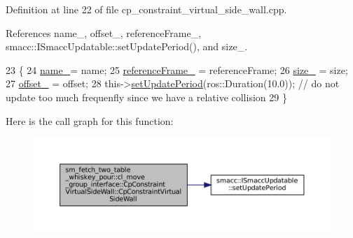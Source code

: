 Definition at line 22 of file cp\+\_\+constraint\+\_\+virtual\+\_\+side\+\_\+wall.\+cpp.



References name\+\_\+, offset\+\_\+, reference\+Frame\+\_\+, smacc\+::\+I\+Smacc\+Updatable\+::set\+Update\+Period(), and size\+\_\+.


\begin{DoxyCode}
23         \{
24             \hyperlink{classsm__fetch__two__table__whiskey__pour_1_1cl__move__group__interface_1_1CpConstraintVirtualSideWall_ae90ce7726ac0391281f3f256f855be68}{name\_}= name;
25             \hyperlink{classsm__fetch__two__table__whiskey__pour_1_1cl__move__group__interface_1_1CpConstraintVirtualSideWall_a6585ab4c5d9c3dd91be0d2d8b87804bb}{referenceFrame\_} = referenceFrame;
26             \hyperlink{classsm__fetch__two__table__whiskey__pour_1_1cl__move__group__interface_1_1CpConstraintVirtualSideWall_a0e9605699e39ffcda32a22a07fffd544}{size\_} = size;
27             \hyperlink{classsm__fetch__two__table__whiskey__pour_1_1cl__move__group__interface_1_1CpConstraintVirtualSideWall_a669238102dc5ac73255f10bc80c1ce69}{offset\_} = offset;
28             this->\hyperlink{classsmacc_1_1ISmaccUpdatable_a88f3b092a81b2d8810a9776c8c69855b}{setUpdatePeriod}(ros::Duration(10.0)); \textcolor{comment}{// do not update too much frequenfly
       since we have a relative collision}
29         \}
\end{DoxyCode}
Here is the call graph for this function\+:
\nopagebreak
\begin{figure}[H]
\begin{center}
\leavevmode
\includegraphics[width=350pt]{classsm__fetch__two__table__whiskey__pour_1_1cl__move__group__interface_1_1CpConstraintVirtualSideWall_aeafb3eca51b2871c91b40e87bc6384d2_cgraph}
\end{center}
\end{figure}
\mbox{\label{classsm__fetch__two__table__whiskey__pour_1_1cl__move__group__interface_1_1CpConstraintVirtualSideWall_a721630de1b2a1aa5dd246fcd775a21d0}} 
